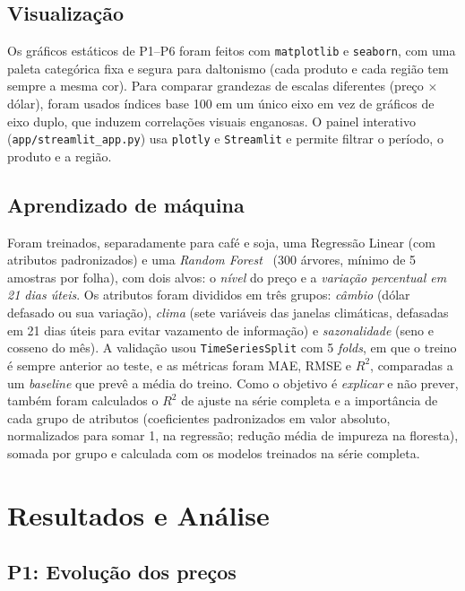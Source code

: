 \documentclass[conference]{IEEEtran}
\begin{document}
\subsection{Visualização}\label{sec:visualizacao}

Os gráficos estáticos de P1--P6 foram feitos com \texttt{matplotlib} e \texttt{seaborn}, com uma
paleta categórica fixa e segura para daltonismo (cada produto e cada região tem sempre a mesma cor). Para
comparar grandezas de escalas diferentes (preço $\times$ dólar), foram usados índices base 100 em um
único eixo em vez de gráficos de eixo duplo, que induzem correlações visuais enganosas. O painel
interativo (\texttt{app/streamlit\_app.py}) usa \texttt{plotly} e \texttt{Streamlit} e permite filtrar o
período, o produto e a região.

\subsection{Aprendizado de máquina}

Foram treinados, separadamente para café e soja, uma Regressão Linear (com atributos padronizados)
e uma \emph{Random Forest}~\cite{breiman} (300 árvores, mínimo de 5 amostras por folha), com dois alvos: o
\emph{nível} do preço e a \emph{variação percentual em 21 dias úteis}. Os atributos foram divididos em três
grupos: \emph{câmbio} (dólar defasado ou sua variação), \emph{clima} (sete variáveis das janelas
climáticas, defasadas em 21 dias úteis para evitar vazamento de informação) e \emph{sazonalidade}
(seno e cosseno do mês). A validação usou \texttt{TimeSeriesSplit} com 5 \emph{folds}, em que o treino é
sempre anterior ao teste, e as métricas foram MAE, RMSE e $R^2$, comparadas a um \emph{baseline} que
prevê a média do treino. Como o objetivo é \emph{explicar} e não prever, também foram calculados o
$R^2$ de ajuste na série completa e a importância de cada grupo de atributos (coeficientes padronizados em valor absoluto, normalizados para somar 1, na regressão; redução média
de impureza na floresta), somada por grupo e calculada com os modelos treinados na série completa.

\FloatBarrier
\section{Resultados e Análise}

\subsection{P1: Evolução dos preços}
\end{document}
